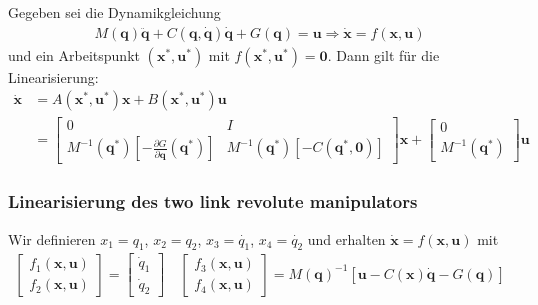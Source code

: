 \documentclass[a4paper, 12pt]{scrartcl}
\begin{document}
\begin{satz}
    Gegeben sei die Dynamikgleichung
    \begin{align*}
        M(\bm{q}) \ddot{\bm{q}} 
        + C(\bm{q}, \bm{\dot{q}}) \bm{\dot{q}} 
        + G(\bm{q}) = \bm{u}
        \Rightarrow
        \dot{\bm{x}} = f(\bm{x}, \bm{u})
    \end{align*}
    und ein Arbeitspunkt $(\bm{x}^*, \bm{u}^*)$ mit $f(\bm{x}^*, \bm{u}^*) = \bm{0}$. 
    Dann gilt für die Linearisierung:
    \begin{align*}
        \dot{\bm{x}}
        &=
        A(\bm{x}^*, \bm{u}^*) \bm{x} + B(\bm{x}^*, \bm{u}^*) \bm{u} \\
        &=
        \begin{bmatrix}
            0 & I \\
            M^{-1}(\bm{q}^*) 
            \left[
                -\frac{\partial G}{\partial \bm{q}}(\bm{q}^*) 
            \right]
            & 
            M^{-1}(\bm{q}^*) 
            \left[
                -C(\bm{q}^*,\bm{0})
            \right]
        \end{bmatrix} 
        \bm{x} +
        \begin{bmatrix}
            0 \\[6pt]
            M^{-1}(\bm{q}^*)
        \end{bmatrix}
        \bm{u}
    \end{align*}
\end{satz}

\subsubsection{Linearisierung des two link revolute manipulators}

Wir definieren  $x_1 = q_1$, $x_2 = q_2$, $x_3 = \dot{q_1}$, $x_4 = \dot{q_2}$  
und erhalten $\dot{\bm{x}} = f(\bm{x},\bm{u})$ mit
\begin{align*}
    \begin{bmatrix}
        f_1(\bm{x},\bm{u})  \\
        f_2(\bm{x},\bm{u}) 
    \end{bmatrix} 
    =
    \begin{bmatrix}
        \dot{q}_1 \\
        \dot{q}_2
    \end{bmatrix}
    \quad
    \begin{bmatrix}
        f_3(\bm{x},\bm{u}) \\
        f_4(\bm{x},\bm{u}) 
    \end{bmatrix}
    =
    M(\bm{q})^{-1}
    \left[ 
        \bm{u} - C(\bm{x}) 
        \bm{\dot{q}}
        - G(\bm{q}) 
    \right]
\end{align*}
\end{document}
